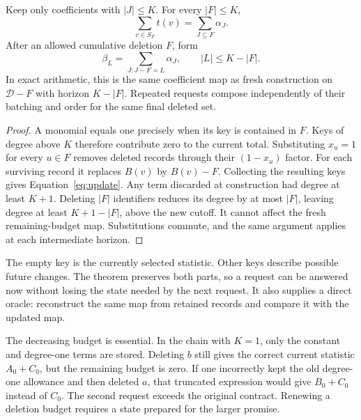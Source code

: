 \begin{theorem}\label{thm:repair}
Keep only coefficients with $|J|\le K$. For every $|F|\le K$,
\[
                 \sum_{v\in S_F}t(v)=\sum_{J\subseteq F}\alpha_J.
\]
After an allowed cumulative deletion $F$, form
\begin{equation}\label{eq:update}
 \beta_L=\sum_{J:J\minus F=L}\alpha_J,
                       \qquad |L|\le K-|F|.
\end{equation}
In exact arithmetic, this is the same coefficient map as fresh construction
on $\mathcal D\minus F$ with horizon $K-|F|$. Repeated requests compose
independently of their batching and order for the same final deleted set.
\end{theorem}
\begin{proof}
A monomial equals one precisely when its key is contained in $F$.
Keys of degree above $K$ therefore contribute zero to the current total.
Substituting $x_u=1$ for every $u\in F$ removes deleted records through
their $(1-x_u)$ factor. For each surviving record it replaces $B(v)$ by
$B(v)\minus F$. Collecting the resulting keys gives Equation~\eqref{eq:update}.
Any term discarded at construction had degree at least $K+1$. Deleting
$|F|$ identifiers reduces its degree by at most $|F|$, leaving degree
at least $K+1-|F|$, above the new cutoff. It cannot affect the fresh
remaining-budget map. Substitutions commute, and the same argument applies
at each intermediate horizon.
\end{proof}

The empty key is the currently selected statistic. Other keys describe
possible future changes. The theorem preserves both parts, so a request
can be answered now without losing the state needed by the next request.
It also supplies a direct oracle: reconstruct the same map from retained
records and compare it with the updated map.

The decreasing budget is essential. In the chain with $K=1$, only the
constant and degree-one terms are stored. Deleting $b$ still gives the
correct current statistic $A_0+C_0$, but the remaining budget is zero.
If one incorrectly kept the old degree-one allowance and then deleted
$a$, that truncated expression would give $B_0+C_0$ instead of $C_0$.
The second request exceeds the original contract. Renewing a deletion
budget requires a state prepared for the larger promise.

